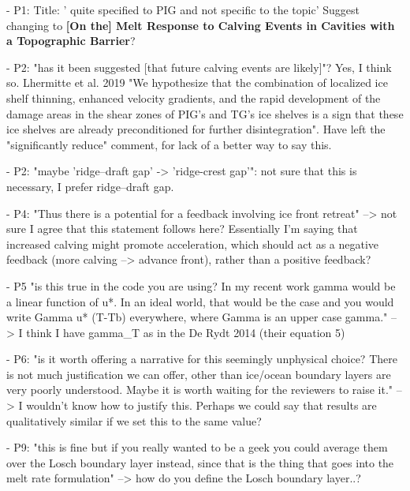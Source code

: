 - P1: Title: ' quite specified to PIG and not specific to the topic' 
	Suggest changing to \textbf{[On the] Melt Response to Calving Events in Cavities with a Topographic Barrier}? 
	
- P2: "has it been suggested [that future calving events are likely]"? 
    Yes, I think so. Lhermitte et al. 2019 "We hypothesize that the combination of localized ice shelf thinning, enhanced velocity gradients, and the rapid development of the damage areas in the shear zones of PIG’s and TG’s ice shelves is a sign that these ice shelves are already preconditioned for further disintegration". Have left the "significantly reduce" comment, for lack of a better way to say this.
    
- P2: "maybe 'ridge--draft gap' -> 'ridge-crest gap'": not sure that this is necessary, I prefer ridge--draft gap.

- P4: "Thus there is a potential for a feedback involving ice front retreat" --> not sure I agree that this statement follows here? Essentially I'm saying that increased calving might promote acceleration, which should act as a negative feedback (more calving --> advance front), rather than a positive feedback?

- P5 "is this true in the code you are using?  In my recent work gamma would be a linear function of u*.  In an ideal world, that would be the case and you would write Gamma u* (T-Tb) everywhere, where Gamma is an upper case gamma." --> I think I have gamma_T as in the De Rydt 2014 (their equation 5)

- P6: "is it worth offering a narrative for this seemingly unphysical choice?  There is not much justification we can offer, other than ice/ocean boundary layers are very poorly understood.  Maybe it is worth waiting for the reviewers to raise it." --> I wouldn't know how to justify this. Perhaps we could say that results are qualitatively similar if we set this to the same value?

- P9: "this is fine but if you really wanted to be a geek you could average them over the Losch boundary layer instead, since that is the thing that goes into the melt rate formulation" --> how do you define the Losch boundary layer..?